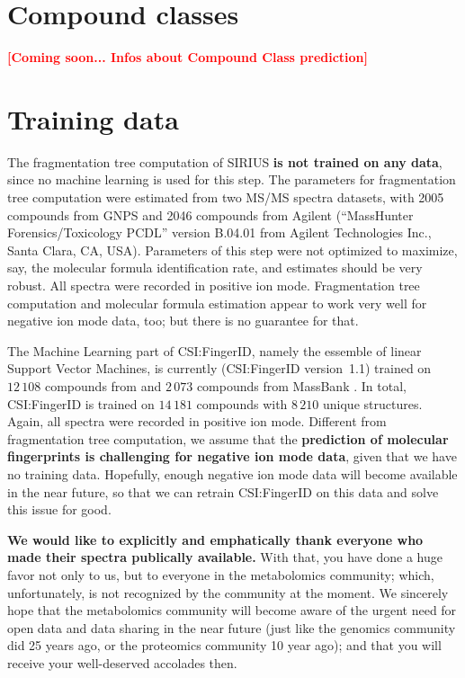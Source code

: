 \documentclass[letterpaper,10pt,openany,oneside]{sphinxmanual}
\newcommand{\todo}[1]{\xspace{\bfseries\sffamily\textcolor{red}{[#1]}}\xspace}
\begin{document}

\section{Compound classes}
\todo{Coming soon... Infos about Compound Class prediction}


\section{Training data}

The fragmentation tree computation of SIRIUS \textbf{is not trained on any
data}, since no machine learning is used for this step.  The parameters for
fragmentation tree computation were estimated from two MS/MS spectra
datasets, with 2005 compounds from GNPS \citep{wang16sharing} and 2046
compounds from Agilent (``MassHunter Forensics/Toxicology PCDL'' version
B.04.01 from Agilent Technologies Inc., Santa Clara, CA, USA).  Parameters of
this step were not optimized to maximize, say, the molecular formula
identification rate, and estimates should be very robust.  All spectra were
recorded in positive ion mode.  Fragmentation tree computation and molecular
formula estimation appear to work very well for negative ion mode data, too;
but there is no guarantee for that.

The Machine Learning part of CSI:FingerID, namely the essemble of linear
Support Vector Machines, is currently (CSI:FingerID version~1.1) trained
on $12\,108$ compounds from \citep{wang16sharing} and $2\,073$ compounds
from MassBank \citep{horai10massbank}.  In total, CSI:FingerID is trained on
$14\,181$ compounds with $8\,210$ unique structures. Again, all spectra were
recorded in
positive ion mode.  Different from fragmentation tree computation, we assume
that the \textbf{prediction of molecular fingerprints is challenging for
negative ion mode data}, given that we have no training data.  Hopefully,
enough negative ion mode data will become available in the near future, so
that we can retrain CSI:FingerID on this data and solve this issue for good.

\textbf{We would like to explicitly and emphatically thank everyone who made
their spectra publically available.}  With that, you have done a huge favor
not only to us, but to everyone in the metabolomics community; which,
unfortunately, is not recognized by the community at the moment.  We
sincerely hope that the metabolomics community will become aware of the
urgent need for open data and data sharing in the near future (just like the
genomics community did 25 years ago, or the proteomics community 10 year
ago); and that you will receive your well-deserved accolades then.
 
\end{document}
